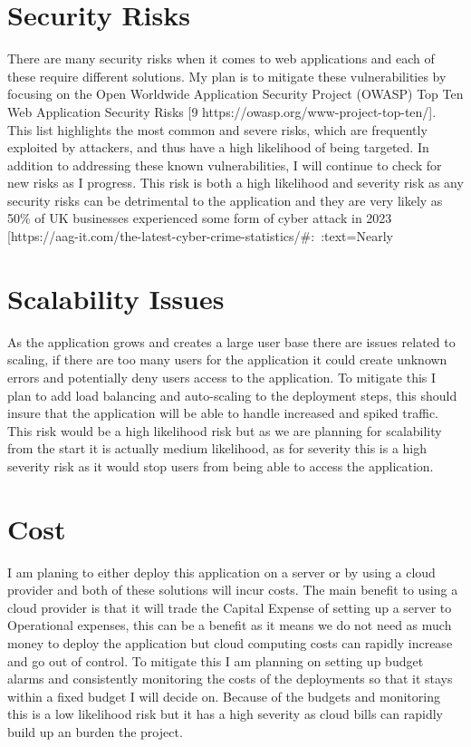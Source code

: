 \documentclass[]{project_report}
\begin{document}
\section{Security Risks}

There are many security risks when it comes to web applications and each of these require different solutions. My plan is to mitigate these vulnerabilities by focusing on the Open Worldwide Application Security Project (OWASP) Top Ten Web Application Security Risks [9 https://owasp.org/www-project-top-ten/]. This list highlights the most common and severe risks, which are frequently exploited by attackers, and thus have a high likelihood of being targeted. In addition to addressing these known vulnerabilities, I will continue to check for new risks as I progress. This risk is both a high likelihood and severity risk as any security risks can be detrimental to the application and they are very likely as 50\% of UK businesses experienced some form of cyber attack in 2023 [https://aag-it.com/the-latest-cyber-crime-statistics/#:~:text=Nearly%


\section{Scalability Issues}

As the application grows and creates a large user base there are issues related to scaling, if there are too many users for the application it could create unknown errors and potentially deny users access to the application. To mitigate this I plan to add load balancing and auto-scaling to the deployment steps, this should insure that the application will be able to handle increased and spiked traffic. This risk would be a high likelihood risk but as we are planning for scalability from the start it is actually medium likelihood, as for severity this is a high severity risk as it would stop users from being able to access the application.

\section{Cost}

I am planing to either deploy this application on a server or by using a cloud provider and both of these solutions will incur costs. The main benefit to using a cloud provider is that it will trade the Capital Expense of setting up a server to Operational expenses, this can be a benefit as it means we do not need as much money to deploy the application but cloud computing costs can rapidly increase and go out of control. To mitigate this I am planning on setting up budget alarms and consistently monitoring the costs of the deployments so that it stays within a fixed budget I will decide on. Because of the budgets and monitoring this is a low likelihood risk but it has a high severity as cloud bills can rapidly build up an burden the project.
\end{document}
